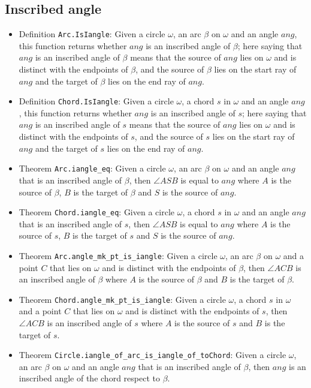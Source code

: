 \documentclass[12pt]{amsart}
\begin{document}
\subsection{Inscribed angle}
\begin{itemize}
    \item Definition \verb|Arc.IsIangle|: Given a circle $\omega$, an arc $\beta$ on $\omega$ and an angle $ang$, this function returns whether $ang$ is an inscribed angle of $\beta$; here saying that $ang$ is an inscribed angle of $\beta$ means that the source of $ang$ lies on $\omega$ and is distinct with the endpoints of $\beta$, and the source of $\beta$ lies on the start ray of $ang$ and the target of $\beta$ lies on the end ray of $ang$.
    \item Definition \verb|Chord.IsIangle|: Given a circle $\omega$, a chord $s$ in $\omega$ and an angle $ang$, this function returns whether $ang$ is an inscribed angle of $s$; here saying that $ang$ is an inscribed angle of $s$ means that the source of $ang$ lies on $\omega$ and is distinct with the endpoints of $s$, and the source of $s$ lies on the start ray of $ang$ and the target of $s$ lies on the end ray of $ang$.
    \item Theorem \verb|Arc.iangle_eq|: Given a circle $\omega$, an arc $\beta$ on $\omega$ and an angle $ang$ that is an inscribed angle of $\beta$, then $\angle ASB$ is equal to $ang$ where $A$ is the source of $\beta$, $B$ is the target of $\beta$ and $S$ is the source of $ang$.
    \item Theorem \verb|Chord.iangle_eq|: Given a circle $\omega$, a chord $s$ in $\omega$ and an angle $ang$ that is an inscribed angle of $s$, then $\angle ASB$ is equal to $ang$ where $A$ is the source of $s$, $B$ is the target of $s$ and $S$ is the source of $ang$.
    \item Theorem \verb|Arc.angle_mk_pt_is_iangle|: Given a circle $\omega$, an arc $\beta$ on $\omega$ and a point $C$ that lies on $\omega$ and is distinct with the endpoints of $\beta$, then $\angle ACB$ is an inscribed angle of $\beta$ where $A$ is the source of $\beta$ and $B$ is the target of $\beta$.
    \item Theorem \verb|Chord.angle_mk_pt_is_iangle|: Given a circle $\omega$, a chord $s$ in $\omega$ and a point $C$ that lies on $\omega$ and is distinct with the endpoints of $s$, then $\angle ACB$ is an inscribed angle of $s$ where $A$ is the source of $s$ and $B$ is the target of $s$.
    \item Theorem \verb|Circle.iangle_of_arc_is_iangle_of_toChord|: Given a circle $\omega$, an arc $\beta$ on $\omega$ and an angle $ang$ that is an inscribed angle of $\beta$, then $ang$ is an inscribed angle of the chord respect to $\beta$.

\end{itemize}
\end{document}

